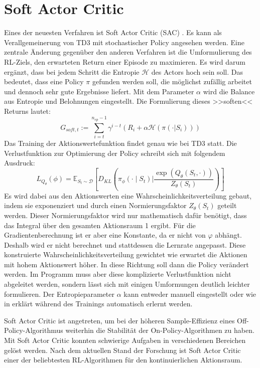 \section{Soft Actor Critic}
\label{section:sac}
Eines der neuesten Verfahren ist Soft Actor Critic (SAC) \cite{haarnoja2018soft}. 
Es kann als Verallgemeinerung von TD3 mit stochastischer Policy angesehen werden.
Eine zentrale Änderung gegenüber den anderen Verfahren ist die Umformulierung des RL-Ziels, den erwarteten Return einer Episode zu maximieren.
Es wird darum ergänzt, dass bei jedem Schritt die Entropie $\mathcal{H}$ des Actors hoch sein soll.
Das bedeutet, dass eine Policy $\pi$ gefunden werden soll, die möglichst zufällig arbeitet und dennoch sehr gute Ergebnisse liefert.
Mit dem Parameter $\alpha$ wird die Balance aus Entropie und Belohnungen eingestellt.
Die Formulierung dieses >>soften<< Returns lautet:
\begin{equation}
	G_{soft,t} := \sum_{i=t}^{n_{ep} - 1} \gamma^{i - t} \left(R_i + \alpha \mathcal{H}(\pi(\cdot | S_i))\right)
\end{equation}
Das Training der Aktionswertefunktion findet genau wie bei TD3 statt.
Die Verlustfunktion zur Optimierung der Policy schreibt sich mit folgendem Ausdruck:
\begin{equation}
	L_{Q_\theta}(\phi) = \mathbb{E}_{S_t \sim \mathcal{D}} \left[D_{KL}\left(\pi_\phi(\cdot \mid S_t) | \frac{\exp(Q_\theta(S_t, \cdot))}{Z_\theta(S_t)}\right)\right]
\end{equation}
Es wird dabei aus den Aktionswerten eine Wahrscheinlichkeitsverteilung gebaut, indem sie exponenziert und durch einen Normierungsfaktor $Z_\theta(S_t)$ geteilt werden.
Dieser Normierungsfaktor wird nur mathematisch dafür benötigt, dass das Integral über den gesamten Aktionsraum 1 ergibt.
Für die Gradientenberechnung ist er aber eine Konstante, da er nicht von $\varphi$ abhängt.
Deshalb wird er nicht berechnet und stattdessen die Lernrate angepasst.
Diese konstruierte Wahrscheinlichkeitsverteilung gewichtet wie erwartet die Aktionen mit hohem Aktionswert höher.
In diese Richtung soll dann die Policy verändert werden.
Im Programm muss aber diese komplizierte Verlustfunktion nicht abgeleitet werden, sondern lässt sich mit einigen Umformungen deutlich leichter formulieren.
Der Entropieparameter $\alpha$ kann entweder manuell eingestellt oder wie in \cite{https://doi.org/10.48550/arxiv.1812.05905} erklärt während des Trainings automatisch erlernt werden.

Soft Actor Critic ist angetreten, um bei der höheren Sample-Effizienz eines Off-Policy-Algorithmus weiterhin die Stabilität der On-Policy-Algorithmen zu haben.
Mit Soft Actor Critic konnten schwierige Aufgaben in verschiedenen Bereichen gelöst werden.
Nach dem aktuellen Stand der Forschung ist Soft Actor Critic einer der beliebtesten RL-Algorithmen für den kontinuierlichen Aktionsraum.
